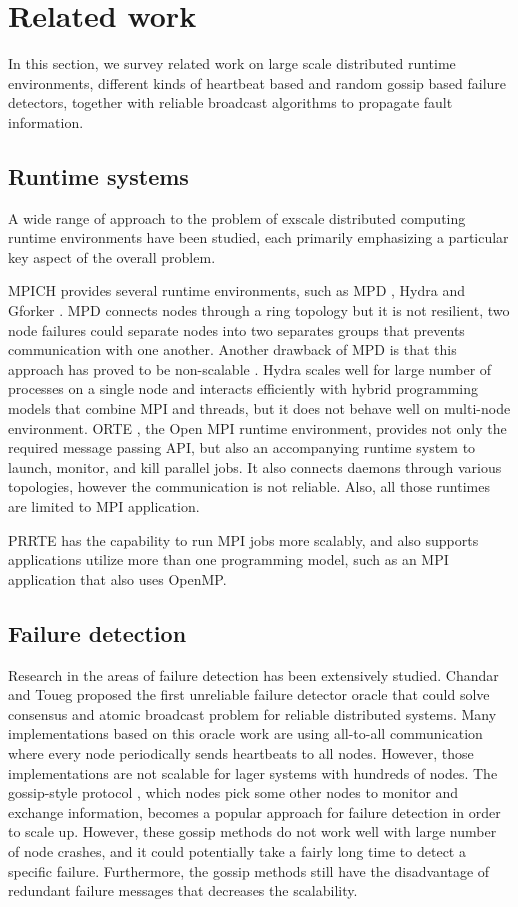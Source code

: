 \documentclass[sigconf]{acmart}
\begin{document}
\section{Related work}
In this section, we survey related work on large scale distributed runtime environments, different kinds of heartbeat based and random gossip based failure detectors, together with reliable broadcast algorithms to propagate fault information.

\subsection{Runtime systems}
A wide range of approach to the problem of exscale distributed computing runtime environments have been studied, each primarily emphasizing a particular key aspect of the overall problem. 

MPICH provides several runtime environments, such as MPD \cite{Butler00}, Hydra \cite{MPICH14} and Gforker \cite{MPICH14}. MPD connects nodes through a ring topology but it is not resilient, two node failures could separate nodes into two separates groups that prevents communication with one another. Another drawback of MPD is that this approach has proved to be non-scalable \cite{Bosilca11}.
Hydra scales well for large number of processes on a single node and interacts efficiently with hybrid programming models that combine MPI and threads, but it does not behave well on multi-node environment. ORTE \cite{Castain05, Jeffrey12}, the Open MPI runtime environment, provides not only the required message passing API, but also an accompanying runtime system to launch, monitor, and kill parallel jobs. It also connects daemons through various topologies, however the communication is not reliable. Also, all those runtimes are limited to MPI application.

PRRTE has the capability to run MPI jobs more scalably, and also supports applications utilize more than one programming model, such as an MPI application that also uses OpenMP. 

\subsection{Failure detection}
Research in the areas of failure detection has been extensively studied. Chandar and Toueg \cite{Chandra96} proposed the first unreliable failure detector oracle that could solve consensus and atomic broadcast problem for reliable distributed systems. Many implementations \cite{Wei02, Larrea00, Kawazoe97} based on this oracle work are using all-to-all communication where every node periodically sends heartbeats to all nodes. However, those implementations are not scalable for lager systems with hundreds of nodes. The gossip-style protocol \cite{van98, Ranganathan01, Gupta01, Abhinandan02}, which nodes pick some other nodes to monitor and exchange information, becomes a popular approach for failure detection in order to scale up. However, these gossip methods do not work well with large number of node crashes, and it could potentially take a fairly long time to detect a specific failure. Furthermore, the gossip methods still have the disadvantage of redundant failure messages that decreases the scalability.
\end{document}
